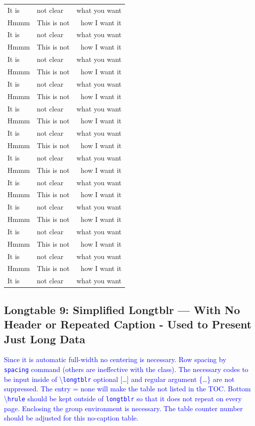 \documentclass[phd,showframe]{ndsu-thesis-2022}
\newcommand\italk[1]{\textcolor{blue}{#1}}  %
\newcommand\cmd[1]{\textbackslash\texttt{#1}}  %
\newcommand\vb[1]{\textcolor{blue}{\texttt{#1}}}%
\begin{document}
\begin{longtable}{l @{\hspace{2cm}} l @{\hspace{1.5cm}} r}
It is   & not clear     & what you want \\
Hmmm    & This is not   & how I want it \\
It is   & not clear     & what you want \\
Hmmm    & This is not   & how I want it \\
It is   & not clear     & what you want \\
Hmmm    & This is not   & how I want it \\
It is   & not clear     & what you want \\
Hmmm    & This is not   & how I want it \\
It is   & not clear     & what you want \\
Hmmm    & This is not   & how I want it \\
It is   & not clear     & what you want \\
Hmmm    & This is not   & how I want it \\
It is   & not clear     & what you want \\
Hmmm    & This is not   & how I want it \\
It is   & not clear     & what you want \\
Hmmm    & This is not   & how I want it \\
It is   & not clear     & what you want \\
Hmmm    & This is not   & how I want it \\
It is   & not clear     & what you want \\
Hmmm    & This is not   & how I want it \\
It is   & not clear     & what you want \\
Hmmm    & This is not   & how I want it \\
It is   & not clear     & what you want \\
\end{longtable}
\endgroup
\addtocounter{table}{-1}%

\vh
\kant[9]

\subsection{Longtable 9: Simplified Longtblr --- With No Header or Repeated Caption - Used to Present Just Long Data}

\italk{Since it is automatic full-width no centering is necessary. Row spacing by \texttt{spacing} command (others are ineffective with the class). The necessary codes to be input inside of \cmd{longtblr} optional [\ldots] and regular argument \{\ldots\} are not suppressed. The entry = none will make the table not listed in the TOC. Bottom \cmd{hrule} should be kept outside of \vb{longtblr} so that it does not repeat on every page. Enclosing the group environment is necessary. The table counter number should be adjusted for this no-caption table.}
\end{document}
